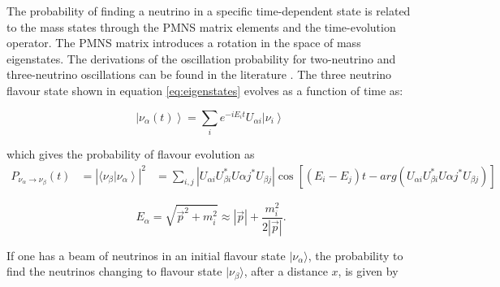 The probability of finding a neutrino in a specific time-dependent state is related to the mass states through the PMNS matrix elements and the time-evolution operator. The PMNS matrix introduces a rotation in the space of mass eigenstates. The derivations of the oscillation probability for two-neutrino and three-neutrino oscillations can be found in the literature \cite{34doi:10.1142/9789812562203_0002}. The three neutrino flavour state shown in equation \ref{eq:eigenstates} evolves as a function of time as:

\begin{equation}
\label{eq:eigenstatesTime}
 \left| \nu_\alpha (t) \right\rangle = \sum_{i} e^{-i E_i t} U_{\alpha i} \left| \nu_i \right\rangle\,
 \end{equation}

which gives the probability of flavour evolution as 
\begin{equation}
\begin{aligned}
P_{\nu_\alpha \rightarrow \nu_\beta} (t) &= \left|  \langle \nu_\beta \left| \nu_\alpha     \right\rangle  \right|^2
& = \sum_{i,j} \left| U_{\alpha i} U_{\beta i}^* U{\alpha j}^* U_{\beta j} \right| \cos[(E_i - E_j)t -arg(U_{\alpha i} U_{\beta i}^* U{\alpha j}^* U_{\beta j} ) ]
\end{aligned}
\end{equation}

\begin{equation}
\label{eq:Energy-momentum}
E_\alpha = \sqrt{\vec{p}^2 + m_i^2} \approx \left| \vec{p} \right| + \frac{m_i^2}{2\left| \vec{p} \right|}.
\end{equation}

If one has a beam of neutrinos in an initial flavour state $|\nu_\alpha \rangle$, the probability to find the neutrinos changing to flavour state $|\nu_\beta \rangle$, after a distance $x$, is given by

